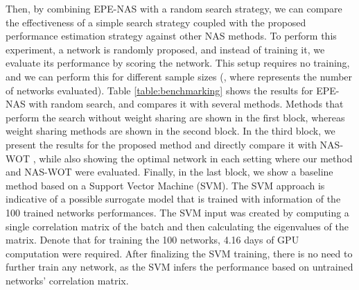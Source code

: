 \documentclass[10pt, conference]{IEEEtran}
\begin{document}
Then, by combining EPE-NAS with a random search strategy, we can compare the effectiveness of a simple search strategy coupled with the proposed performance estimation strategy against other NAS methods. To perform this experiment, a network is randomly proposed, and instead of training it, we evaluate its performance by scoring the network. This setup requires no training, and we can perform this for different sample sizes (, where  represents the number of networks evaluated). Table \ref{table:benchmarking} shows the results for EPE-NAS with random search, and compares it with several methods. Methods that perform the search without weight sharing are shown in the first block, whereas weight sharing methods are shown in the second block. In the third block, we present the results for the proposed method and directly compare it with NAS-WOT \cite{mellor2020neural}, while also showing the optimal network in each setting where our method and NAS-WOT were evaluated. Finally, in the last block, we show a baseline method based on a Support Vector Machine (SVM). The SVM approach is indicative of a possible surrogate model that is trained with information of the 100 trained networks performances. The SVM input was created by computing a single correlation matrix of the batch and then calculating the eigenvalues of the matrix. Denote that for training the 100 networks, 4.16 days of GPU computation were required. After finalizing the SVM training, there is no need to further train any network, as the SVM infers the performance based on untrained networks' correlation matrix.
\end{document}
